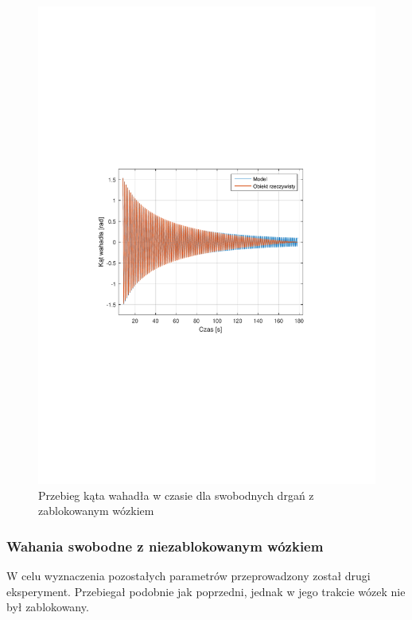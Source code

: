 \documentclass[12pt]{article}
\begin{document}
\begin{figure}[!htb]
    \begin{center}
        \includegraphics[width=16cm,trim=3cm 9cm 3cm 9cm,clip]
        {../res/img/idf_pend1.pdf}
    \end{center}
    \caption{Przebieg kąta wahadła w czasie dla swobodnych drgań z zablokowanym
    wózkiem} 
    \label{rys:idf_pend1}
\end{figure}

\newpage

\subsubsection{Wahania swobodne z niezablokowanym wózkiem}

W celu wyznaczenia pozostałych parametrów przeprowadzony został drugi
eksperyment. Przebiegał podobnie jak poprzedni, jednak w jego trakcie wózek nie
był zablokowany.
\end{document}
